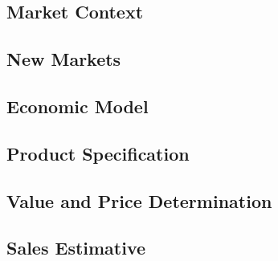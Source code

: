 \subsection{Market Context}

\subsection{New Markets}

\subsection{Economic Model}

\subsection{Product Specification}
    
    
\subsection{Value and Price Determination}

\subsection{Sales Estimative}